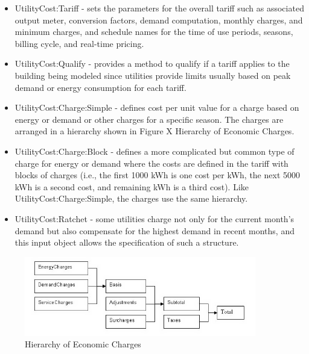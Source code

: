 \begin{itemize}
\item UtilityCost:Tariff - sets the parameters for the overall tariff such
as associated output meter, conversion factors, demand computation,
monthly charges, and minimum charges, and schedule names for the time
of use periods, seasons, billing cycle, and real-time pricing.
\item UtilityCost:Qualify - provides a method to qualify if a tariff applies
to the building being modeled since utilities provide limits usually
based on peak demand or energy consumption for each tariff.
\item UtilityCost:Charge:Simple - defines cost per unit value for a charge
based on energy or demand or other charges for a specific season.
The charges are arranged in a hierarchy shown in Figure X Hierarchy
of Economic Charges.
\item UtilityCost:Charge:Block - defines a more complicated but common type
of charge for energy or demand where the costs are defined in the
tariff with blocks of charges (i.e., the first 1000 kWh is one cost
per kWh, the next 5000 kWh is a second cost, and remaining kWh is
a third cost). Like UtilityCost:Charge:Simple, the charges use the
same hierarchy.
\item UtilityCost:Ratchet - some utilities charge not only for the current
month's demand but also compensate for the highest demand in recent
months, and this input object allows the specification of such a structure.
\end{itemize}

\begin{figure}[hbtp]
\centering
\includegraphics[width=0.9\textwidth, height=0.9\textheight, keepaspectratio=true]{media/tariff-charges.png}
\caption{Hierarchy of Economic Charges}
\end{figure}

